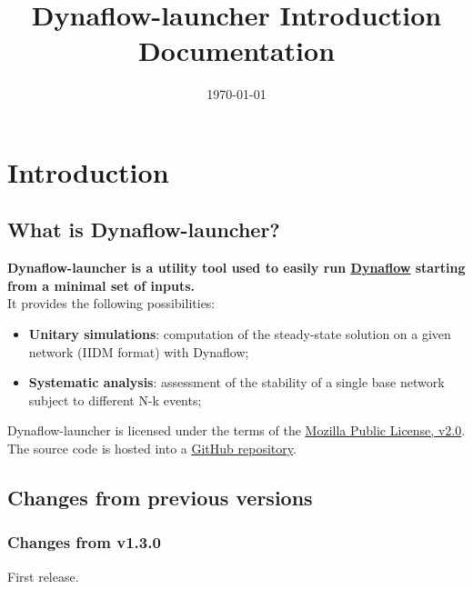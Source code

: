 \documentclass[a4paper, 12pt]{report}
\begin{document}
\title{Dynaflow-launcher Introduction Documentation}
\date\today

\maketitle
\tableofcontents

\chapter{Introduction}

\section{What is Dynaflow-launcher?}

\textbf{Dynaflow-launcher is a utility tool used to easily run \href{https://dynawo.github.io/}{\underline{Dynaflow}}
starting from a minimal set of inputs.} \\

It provides the following possibilities:
\begin{itemize}
  \item \textbf{Unitary simulations}: computation of the steady-state solution on a given network (IIDM format) with Dynaflow;
  \item \textbf{Systematic analysis}: assessment of the stability of a single base network subject to different N-k events;
\end{itemize}

Dynaflow-launcher is licensed under the terms of the \href{http://mozilla.org/MPL/2.0}{\underline{Mozilla Public License, v2.0}}.
The source code is hosted into a \href{https://github.com/dynawo/dynaflow-launcher} {\underline{GitHub repository}}. \\

\section{Changes from previous versions}

\subsection{Changes from v1.3.0}
First release.
\end{document}

